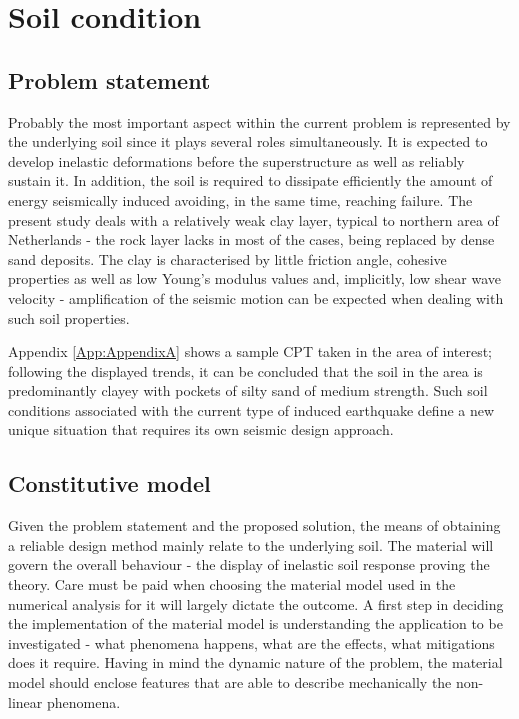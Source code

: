\documentclass[12pt,a4paper]{report}
\begin{document}
\section{Soil condition}
\subsection{Problem statement}
Probably the most important aspect within the current problem is represented by the underlying soil since it plays several roles simultaneously. It is expected to develop inelastic deformations before the superstructure as well as reliably sustain it. In addition, the soil is required to dissipate efficiently the amount of energy seismically induced avoiding, in the same time, reaching failure. The present study deals with a relatively weak clay layer, typical to northern area of Netherlands - the rock layer lacks in most of the cases, being replaced by dense sand deposits. The clay is characterised by little friction angle, cohesive properties as well as low Young's modulus values and, implicitly, low shear wave velocity - amplification of the seismic motion can be expected when dealing with such soil properties.

Appendix \ref{App:AppendixA} shows a sample CPT taken in the area of interest; following the displayed trends, it can be concluded that the soil in the area is predominantly clayey with pockets of silty sand of medium strength. Such soil conditions associated with the current type of induced earthquake define a new unique situation that requires its own seismic design approach.

\subsection{Constitutive model}
Given the problem statement and the proposed solution, the means of obtaining a reliable design method mainly relate to the underlying soil. The material will govern the overall behaviour - the display of inelastic soil response proving the theory. Care must be paid when choosing the material model used in the numerical analysis for it will largely dictate the outcome. A first step in deciding the implementation of the material model is understanding the application to be investigated - what phenomena happens, what are the effects, what mitigations does it require. Having in mind the dynamic nature of the problem, the material model should enclose features that are able to describe mechanically the non-linear phenomena. 
\end{document}
